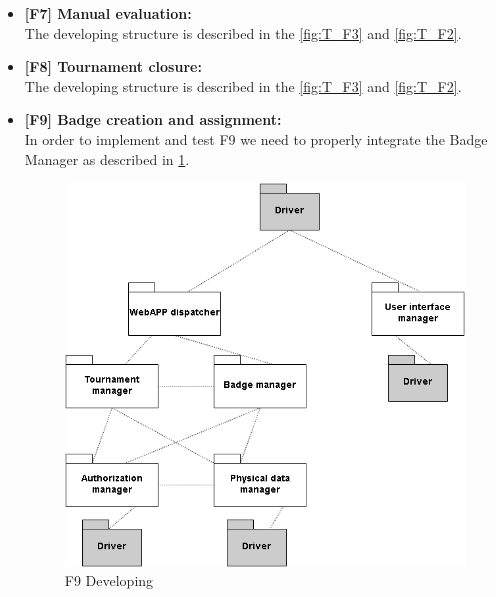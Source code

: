 \begin{itemize}
    \item \textbf{[F7] Manual evaluation:} \\
        The developing structure is described in the \ref{fig:T_F3} and \ref{fig:T_F2}.
    \item \textbf{[F8] Tournament closure:} \\
        The developing structure is described in the \ref{fig:T_F3} and \ref{fig:T_F2}.
        
    \item \textbf{[F9] Badge creation and assignment:} \\
        In order to implement and test F9 we need to properly integrate the Badge Manager as described in \ref{fig:T_F9}.
        \begin{figure}[h!]
            \centering
            \includegraphics[width=\linewidth]{Images/T_F9.png}
            \caption{F9 Developing}
            \label{fig:T_F9}
        \end{figure}
        

\end{itemize}
